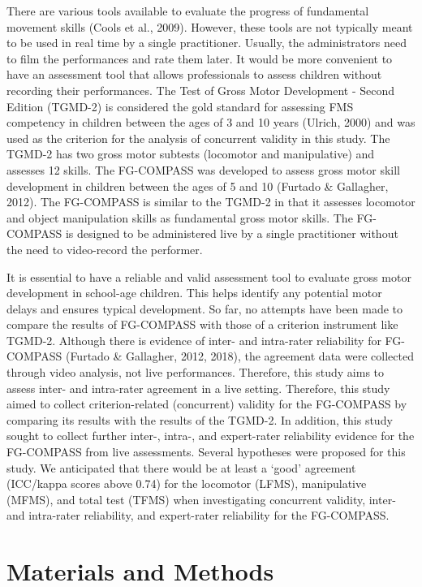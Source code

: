 \documentclass[
  man,
  colorlinks=true,linkcolor=blue,citecolor=blue,urlcolor=blue]{apa7}
\begin{document}
There are various tools available to evaluate the progress of
fundamental movement skills (Cools et al., 2009). However, these tools
are not typically meant to be used in real time by a single
practitioner. Usually, the administrators need to film the performances
and rate them later. It would be more convenient to have an assessment
tool that allows professionals to assess children without recording
their performances. The Test of Gross Motor Development - Second Edition
(TGMD-2) is considered the gold standard for assessing FMS competency in
children between the ages of 3 and 10 years (Ulrich, 2000) and was used
as the criterion for the analysis of concurrent validity in this study.
The TGMD-2 has two gross motor subtests (locomotor and manipulative) and
assesses 12 skills. The FG-COMPASS was developed to assess gross motor
skill development in children between the ages of 5 and 10 (Furtado \&
Gallagher, 2012). The FG-COMPASS is similar to the TGMD-2 in that it
assesses locomotor and object manipulation skills as fundamental gross
motor skills. The FG-COMPASS is designed to be administered live by a
single practitioner without the need to video-record the performer.

It is essential to have a reliable and valid assessment tool to evaluate
gross motor development in school-age children. This helps identify any
potential motor delays and ensures typical development. So far, no
attempts have been made to compare the results of FG-COMPASS with those
of a criterion instrument like TGMD-2. Although there is evidence of
inter- and intra-rater reliability for FG-COMPASS (Furtado \& Gallagher,
2012, 2018), the agreement data were collected through video analysis,
not live performances. Therefore, this study aims to assess inter- and
intra-rater agreement in a live setting. Therefore, this study aimed to
collect criterion-related (concurrent) validity for the FG-COMPASS by
comparing its results with the results of the TGMD-2. In addition, this
study sought to collect further inter-, intra-, and expert-rater
reliability evidence for the FG-COMPASS from live assessments. Several
hypotheses were proposed for this study. We anticipated that there would
be at least a `good' agreement (ICC/kappa scores above 0.74) for the
locomotor (LFMS), manipulative (MFMS), and total test (TFMS) when
investigating concurrent validity, inter- and intra-rater reliability,
and expert-rater reliability for the FG-COMPASS.

\hypertarget{materials-and-methods}{%
\section{Materials and Methods}\label{materials-and-methods}}
\end{document}
